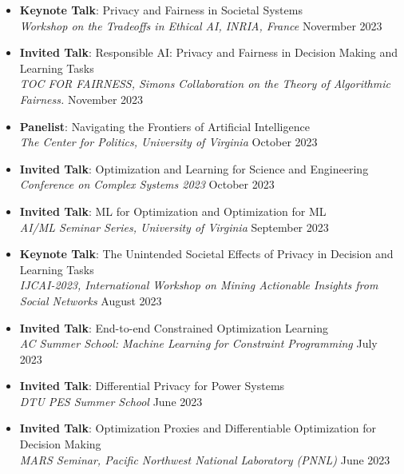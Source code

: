 

\begin{itemize}
  \item {\bf Keynote Talk}: {Privacy and Fairness in Societal Systems}\\
  {\em  Workshop on the Tradeoffs in Ethical AI, INRIA, France}
  \hfill{Novermber 2023}

  \item {\bf Invited Talk}: {Responsible AI: Privacy and Fairness in Decision Making and Learning Tasks}\\
  {\em  TOC FOR FAIRNESS, Simons Collaboration on the Theory of Algorithmic Fairness.}
  \hfill{November 2023}

  \item {\bf Panelist}: {Navigating the Frontiers of Artificial Intelligence}\\
  {\em  The Center for Politics, University of Virginia}
  \hfill{October 2023}

  \item {\bf Invited Talk}: {Optimization and Learning for Science and Engineering}\\
  {\em  Conference on Complex Systems 2023}
  \hfill{October 2023}

  \item {\bf Invited Talk}: {ML for Optimization and Optimization for ML}\\
  {\em  AI/ML Seminar Series, University of Virginia}
  \hfill{September 2023}

  \item {\bf Keynote Talk}: {The Unintended Societal Effects of Privacy in Decision and Learning Tasks}\\
  {\em  IJCAI-2023, International Workshop on Mining Actionable Insights from Social Networks}
  \hfill{August 2023}

  \item {\bf Invited Talk}: {End-to-end Constrained Optimization Learning}\\
  {\em  AC Summer School: Machine Learning for Constraint Programming}
  \hfill{July 2023}

  \item {\bf Invited Talk}: {Differential Privacy for Power Systems}\\
  {\em  DTU PES Summer School}
  \hfill{June 2023}

  \item {\bf Invited Talk}: {Optimization Proxies and Differentiable Optimization for Decision Making}\\
  {\em  MARS Seminar, Pacific Northwest National Laboratory (PNNL)}
  \hfill{June 2023}


\end{itemize}
